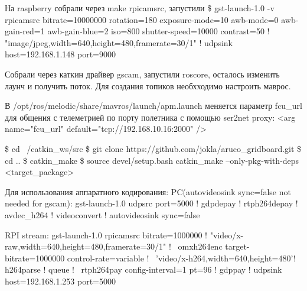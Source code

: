 \begin{MyCode}
На raspberry собрали через make rpicamsrc,
запустили 
\$ gst-launch-1.0 -v rpicamsrc bitrate=10000000 rotation=180 exposure-mode=10 awb-mode=0 awb-gain-red=1 awb-gain-blue=2 iso=800 shutter-speed=10000 contrast=50 ! "image/jpeg,width=640,height=480,framerate=30/1" ! udpsink host=192.168.1.148 port=9000
\end{MyCode}

Собрали через каткин драйвер gscam, запустили roscore, осталось изменить лаунч и получить поток.
Для создания топиков необхходимо настроить маврос.

В /opt/ros/melodic/share/mavros/launch/apm.launch меняется параметр fcu\_url для общения с телеметрией по порту полетника с помощью ser2net proxy:
<arg name="fcu\_url" default="tcp://192.168.10.16:2000" />

\$ cd ~/catkin\_ws/src
\$ git clone https://github.com/jokla/aruco\_gridboard.git
\$ cd ..
\$ catkin\_make
\$ source devel/setup.bash
catkin\_make --only-pkg-with-deps <target\_package>






Для использования аппаратного кодирования:
PC(autovideosink sync=false not needed for gscam):
gst-launch-1.0 udpsrc port=5000 ! gdpdepay ! rtph264depay ! avdec\_h264 ! videoconvert ! autovideosink sync=false

RPI stream:
gst-launch-1.0 rpicamsrc bitrate=1000000 ! "video/x-raw,width=640,height=480,framerate=30/1" ! \
omxh264enc target-bitrate=1000000 control-rate=variable ! \
'video/x-h264,width=640,height=480'! h264parse ! queue ! \
rtph264pay config-interval=1 pt=96 ! gdppay ! udpsink host=192.168.1.253 port=5000
